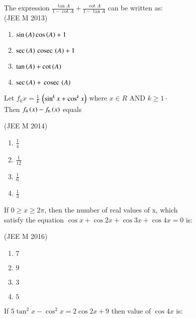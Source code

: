 \iffalse
 \title{ASSIGNMENT-1}
 \author{EE24BTECH11008-ASLIN GARVASIS}
 \section{mains}
\fi
\item The expression $\frac{\tan A}{1-\cot A} +\frac{\cot A}{1-\tan A}$ can be written as:\\

\hfill {(JEE M 2013)}\\
    \begin{enumerate}
    \item $\sin\left(A\right)\cos\left(A\right)+1$
    \item $\sec\left(A\right)\,\text{cosec}\,\left(A\right)+1$
    \item $\tan\left(A\right)+\cot\left(A\right)$ 
    \item $\sec\left(A\right)+\,\text{cosec}\,\left(A\right)$
    \end{enumerate}
\item Let $f_{k}x=\frac{1}{k}$ $\left(\sin^{k}x+\cos^{k}x\right)$ where $x\in R$ AND $k\geq 1 \cdot $\\
 Then $f_{4}\left(x\right)-f_{6}\left(x\right)$ equals

\hfill {(JEE M 2014)}\\
    \begin{enumerate}
    \item  $\frac{1}{4}$ 
     \item $\frac{1}{12}$
    \item $\frac{1}{6}$
    \item $\frac{1}{3}$
    \end{enumerate}
\item If $0 \ge x \ge 2\pi$, then the number of real values of x, which \\  satisfy the equation $\cos x+\cos2x+\cos3x+\cos4x=0$ is:

\hfill {(JEE M 2016)}\\
    \begin{enumerate}
    \item $7$
    \item $9$
    \item $3$
    \item $5$
    \end{enumerate}
    
\item If $5${$\tan^2x-\cos^2x=2\cos2x+9$} then value of $\cos 4x$ is:

